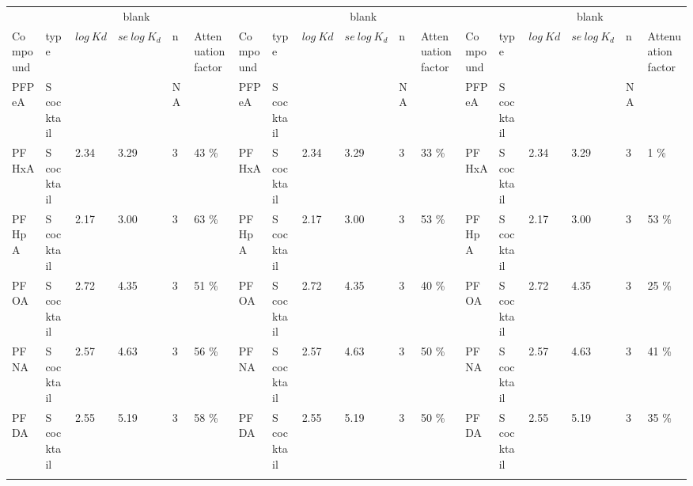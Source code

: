 \begin{sidewaystable}
{\begin{threeparttable}
\begin{tabular}{llllllllllllllllll}
         & \multicolumn{5}{c}{blank}                                                 &          & \multicolumn{5}{c}{blank}                                                 &          & \multicolumn{5}{c}{blank}                                                 \\
         \cmidrule(l){3-6} \cmidrule(l){9-12} \cmidrule(l){15-18}
Compound & type           & $log~Kd$ & $se~log~K_d$ & n  & Attenuation factor                   & Compound & type           & $log~Kd$ & $se~log~K_d$ & n  & Attenuation factor                    & Compound & type           & $log~Kd$ & $se~log~K_d$ & n  & Attenuation factor                   \\ \midrule
PFPeA    & S cocktail    &        &           & NA &                                & PFPeA    & S cocktail    &        &           & NA &                                & PFPeA    & S cocktail    &        &           & NA &                                \\
PFHxA    & S cocktail    & 2.34   & 3.29      & 3  & 43 \%                          & PFHxA    & S cocktail    & 2.34   & 3.29      & 3  & 33 \%                          & PFHxA    & S cocktail    & 2.34   & 3.29      & 3  & 1 \%                           \\
PFHpA    & S cocktail    & 2.17   & 3.00      & 3  & 63 \%                          & PFHpA    & S cocktail    & 2.17   & 3.00      & 3  & 53 \%                          & PFHpA    & S cocktail    & 2.17   & 3.00      & 3  & 53 \%                          \\
PFOA     & S cocktail    & 2.72   & 4.35      & 3  & 51 \%                          & PFOA     & S cocktail    & 2.72   & 4.35      & 3  & 40 \%                          & PFOA     & S cocktail    & 2.72   & 4.35      & 3  & 25 \%                          \\
PFNA     & S cocktail    & 2.57   & 4.63      & 3  & 56 \%                          & PFNA     & S cocktail    & 2.57   & 4.63      & 3  & 50 \%                          & PFNA     & S cocktail    & 2.57   & 4.63      & 3  & 41 \%                          \\
PFDA     & S cocktail    & 2.55   & 5.19      & 3  & 58 \%                          & PFDA     & S cocktail    & 2.55   & 5.19      & 3  & 50 \%                          & PFDA     & S cocktail    & 2.55   & 5.19      & 3  & 35 \%                          \\
         &                &        &           &    &                                &          &                &        &           &    &                                &          &                &        &           &    &                                \\

\end{tabular}
\end{threeparttable}}
\end{sidewaystable}
